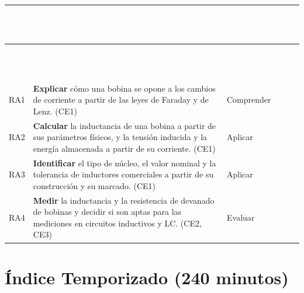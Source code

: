 \documentclass[11pt,letterpaper]{article}
\begin{document}
\begin{xltabular}{\linewidth}{>{\raggedright\arraybackslash}p{1.1cm}>{\raggedright\arraybackslash}X>{\raggedright\arraybackslash}p{3.9cm}}
 \textcolor{white}{\textbf{\#}} & \textcolor{white}{\textbf{Resultado de aprendizaje}} & \textcolor{white}{\textbf{Nivel (Taxonomía de Bloom)}} \\
\endfirsthead
{} \textcolor{white}{\textbf{\#}} & \textcolor{white}{\textbf{Resultado de aprendizaje}} & \textcolor{white}{\textbf{Nivel (Taxonomía de Bloom)}} \\
\endhead
\bottomrule
\endlastfoot
  RA1 & \textbf{Explicar} cómo una bobina se opone a los cambios de corriente a partir de las leyes de Faraday y de Lenz. (CE1) & Comprender \\
   RA2 & \textbf{Calcular} la inductancia de una bobina a partir de sus parámetros físicos, y la tensión inducida y la energía almacenada a partir de su corriente. (CE1) & Aplicar \\
  RA3 & \textbf{Identificar} el tipo de núcleo, el valor nominal y la tolerancia de inductores comerciales a partir de su construcción y su marcado. (CE1) & Aplicar \\
   RA4 & \textbf{Medir} la inductancia y la resistencia de devanado de bobinas y decidir si son aptas para las mediciones en circuitos inductivos y LC. (CE2, CE3) & Evaluar \\
\end{xltabular}

\section{Índice Temporizado (240 minutos)}
\end{document}
